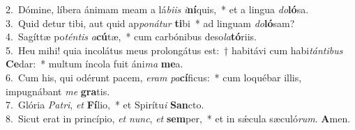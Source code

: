 {2.~}Dómine, líbera ánimam meam a lá\textit{bi}\textit{is} \textit{i}\textbf{ní}quis,~* et a lingua \textit{do}\textbf{ló}sa.\\
{3.~}Quid detur tibi, aut quid ap\textit{po}\textit{ná}\textit{tur} \textbf{ti}bi~* ad linguam \textit{do}\textbf{ló}sam?\\
{4.~}Sagíttæ po\textit{tén}\textit{tis} \textit{a}\textbf{cú}tæ,~* cum carbónibus deso\textit{la}\textbf{tó}riis.\\
{5.~}Heu mihi! quia incolátus meus prolongátus est:~† habitávi cum habi\textit{tán}\textit{ti}\textit{bus} \textbf{Ce}dar:~* multum íncola fuit áni\textit{ma} \textbf{me}a.\\
{6.~}Cum his, qui odérunt pacem, \textit{e}\textit{ram} \textit{pa}\textbf{cí}ficus:~* cum loquébar illis, impugnábant \textit{me} \textbf{gra}tis.\\
{7.~}Glória \textit{Pa}\textit{tri}, \textit{et} \textbf{Fí}lio,~* et Spirítu\textit{i} \textbf{San}cto.\\
{8.~}Sicut erat in princípio, \textit{et} \textit{nunc}, \textit{et} \textbf{sem}per,~* et in sǽcula sæculó\textit{rum}. \textbf{A}men.\\
